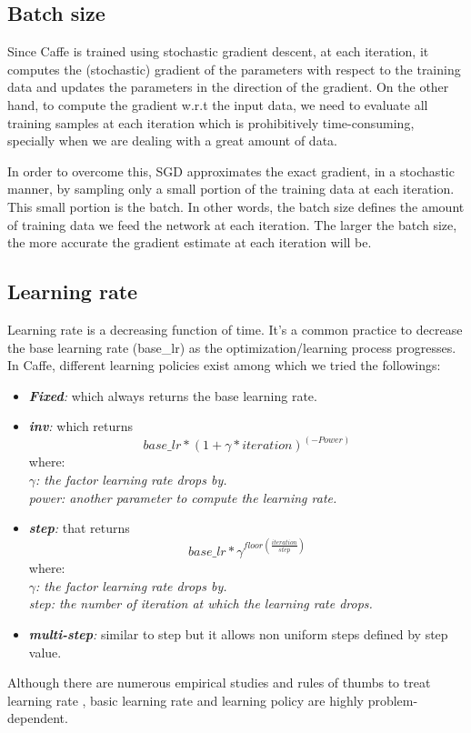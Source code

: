 \subsection{Batch size}

Since Caffe is trained using stochastic gradient descent, at each iteration, it computes the (stochastic) gradient of the parameters with respect to the training data and updates the parameters in the direction of the gradient. On the other hand, to compute the gradient w.r.t the input data, we need to evaluate all training samples at each iteration which is prohibitively time-consuming, specially when we are dealing with a great amount of data. 

\indent In order to overcome this, SGD approximates the exact gradient, in a stochastic manner, by sampling only a small portion of the training data at each iteration. This small portion is the batch. In other words, the batch size defines the amount of training data we feed the network at each iteration. The larger the batch size, the more accurate the gradient estimate at each iteration will be. 

\subsection{Learning rate}

Learning rate is a decreasing function of time. It's a common practice to decrease the base learning rate (base\_lr) as the optimization/learning process progresses. In Caffe, different learning policies exist among which we tried the followings:
\begin{itemize}
\item \textit{\textbf{Fixed}:} which always returns the base learning rate.
\item \textit{\textbf{inv}:} which returns $$base\_lr * (1 + \gamma * iteration) ^ {(-Power)}$$ where:\\\textit{ $\gamma$: the factor learning rate drops by.}\\\textit{power: another parameter to compute the learning rate.}
\item \textit{\textbf{step}:} that returns $$base\_lr * \gamma ^ {floor(\frac{iteration}{step})}$$ where:\\ \textit{$\gamma$: the factor learning rate drops by.}\\\textit{step: the number of iteration at which the learning rate drops.} 
\item \textit{\textbf{multi-step}:} similar to step but it allows non uniform steps defined by step value.
\end{itemize}
Although there are numerous empirical studies and rules of thumbs to treat learning rate \cite{senior2013empirical,yu1995dynamic,minai1990acceleration}, basic learning rate and learning policy are highly problem-dependent.  

